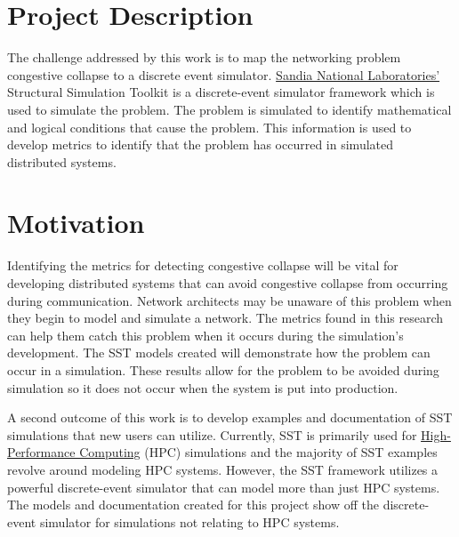 \documentclass{article}
\begin{document}
\section{Project Description} %

The challenge addressed by this work is to map the networking problem congestive collapse to a discrete event simulator. \href{https://www.sandia.gov/}{Sandia National Laboratories'} Structural Simulation Toolkit is a discrete-event simulator framework which is used to simulate the problem. The problem is simulated to identify mathematical and logical conditions that cause the problem. This information is used to develop metrics to identify that the problem has occurred in simulated distributed systems.

\section{Motivation} %

Identifying the metrics for detecting congestive collapse will be vital for developing distributed systems that can avoid congestive collapse from occurring during communication. Network architects may be unaware of this problem when they begin to model and simulate a network. The metrics found in this research can help them catch this problem when it occurs during the simulation's development. The SST models created will demonstrate how the problem can occur in a simulation. These results allow for the problem to be avoided during simulation so it does not occur when the system is put into production.

A second outcome of this work is to develop examples and documentation of SST simulations that new users can utilize. Currently, SST is primarily used for \href{https://en.wikipedia.org/wiki/High-performance_computing}{High-Performance Computing} (HPC) simulations and the majority of SST examples revolve around modeling HPC systems. However, the SST framework utilizes a powerful discrete-event simulator that can model more than just HPC systems. The models and documentation created for this project show off the discrete-event simulator for simulations not relating to HPC systems.
\end{document}
